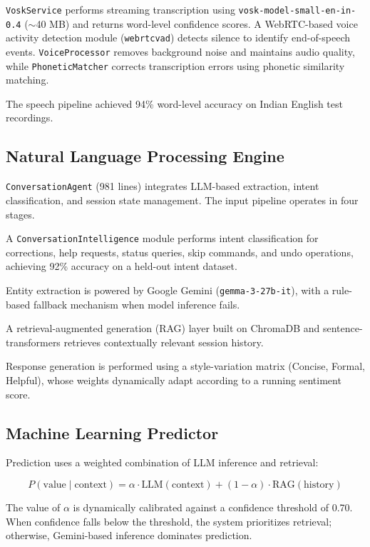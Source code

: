 \documentclass[conference]{IEEEtran}
\begin{document}
\texttt{VoskService} performs streaming transcription using
\texttt{vosk-model-small-en-in-0.4} ($\sim$40 MB) and returns word-level
confidence scores. A WebRTC-based voice activity detection module
(\texttt{webrtcvad}) detects silence to identify end-of-speech events.
\texttt{VoiceProcessor} removes background noise and maintains audio quality, while
\texttt{PhoneticMatcher} corrects transcription errors using phonetic similarity
matching.

The speech pipeline achieved 94\% word-level accuracy on Indian English test
recordings.

\subsection{Natural Language Processing Engine}

\texttt{ConversationAgent} (981 lines) integrates LLM-based extraction, intent
classification, and session state management. The input pipeline operates in four
stages.

A \texttt{ConversationIntelligence} module performs intent classification for
corrections, help requests, status queries, skip commands, and undo operations,
achieving 92\% accuracy on a held-out intent dataset.

Entity extraction is powered by Google Gemini
(\texttt{gemma-3-27b-it}), with a rule-based fallback mechanism when model
inference fails.

A retrieval-augmented generation (RAG) layer built on ChromaDB and
sentence-transformers retrieves contextually relevant session history.

Response generation is performed using a style-variation matrix
(Concise, Formal, Helpful), whose weights dynamically adapt according to a running
sentiment score.

\subsection{Machine Learning Predictor}

Prediction uses a weighted combination of LLM inference and retrieval:

\begin{equation}
P(\text{value} \mid \text{context}) =
\alpha \cdot \text{LLM}(\text{context})
+ (1-\alpha) \cdot \text{RAG}(\text{history})
\label{eq:prediction}
\end{equation}

The value of $\alpha$ is dynamically calibrated against a confidence threshold of
0.70. When confidence falls below the threshold, the system prioritizes retrieval;
otherwise, Gemini-based inference dominates prediction.
\end{document}
